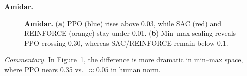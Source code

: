 \noindent \textbf{Amidar.}
\begin{figure}[htbp]
	\centering
	\quad
	\caption{\textbf{Amidar.}
		(\textbf{a}) PPO (blue) rises above 0.03, while SAC (red) and REINFORCE (orange) stay under 0.01. 
		(\textbf{b}) Min--max scaling reveals PPO crossing 0.30, whereas SAC/REINFORCE remain below 0.1.}
	\label{fig:amidar_combined}
\end{figure}

\noindent
\emph{Commentary.} In Figure~\ref{fig:amidar_combined}, the difference is more dramatic in min--max space, where PPO nears 0.35 vs.\ \(\approx0.05\) in human norm.

\medskip

